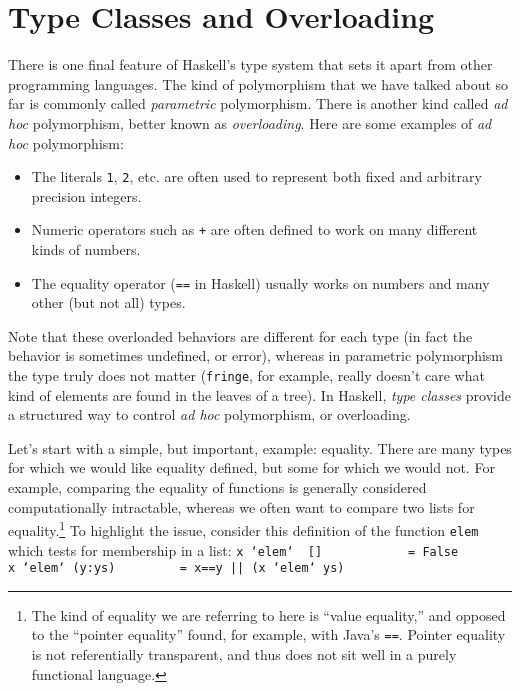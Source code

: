 \section{Type Classes and Overloading}
\label{tut-type-classes}

There is one final feature of Haskell's type system that sets it apart
from other programming languages.  The kind of polymorphism that we
have talked about so far is commonly called {\em parametric}
polymorphism.  There is another kind called {\em ad hoc} polymorphism,
better known as {\em overloading}.  Here are some examples of {\em ad hoc}
polymorphism:
\begin{itemize}
\item The literals \mbox{\tt 1}, \mbox{\tt 2}, etc. are often used to represent both
fixed and arbitrary precision integers.

\item Numeric operators such as \mbox{\tt +} are often defined to work on
many different kinds of numbers.

\item The equality operator (\mbox{\tt ==} in Haskell) usually works on
numbers and many other (but not all) types.

\end{itemize}
Note that these overloaded behaviors are different for each type
(in fact the behavior is sometimes undefined, or error), whereas in
parametric polymorphism the type truly does not matter (\mbox{\tt fringe}, for
example, really doesn't care what kind of elements are found in the
leaves of a tree).  In Haskell, {\em type classes} provide a
structured way to control {\em ad hoc} polymorphism, or overloading.

Let's start with a simple, but important, example: equality.
There are many types for which we would like equality defined, but
some for which we would not.  For example, comparing the equality of
functions is generally considered computationally intractable, whereas
we often want to compare two lists for equality.\footnote{The kind of
equality we are referring to here is ``value equality,'' and opposed
to the ``pointer equality'' found, for example, with Java's \mbox{\tt ==}.
Pointer equality is not referentially transparent, and thus does not
sit well in a purely functional language.} To highlight the issue,
consider this definition of the function \mbox{\tt elem} which tests for
membership in a list:
\bprog
\mbox{\tt x\ `elem`\ \ []\ \ \ \ \ \ \ \ \ \ \ \ =\ False}\\
\mbox{\tt x\ `elem`\ (y:ys)\ \ \ \ \ \ \ \ \ =\ x==y\ ||\ (x\ `elem`\ ys)}
\eprog
{}

